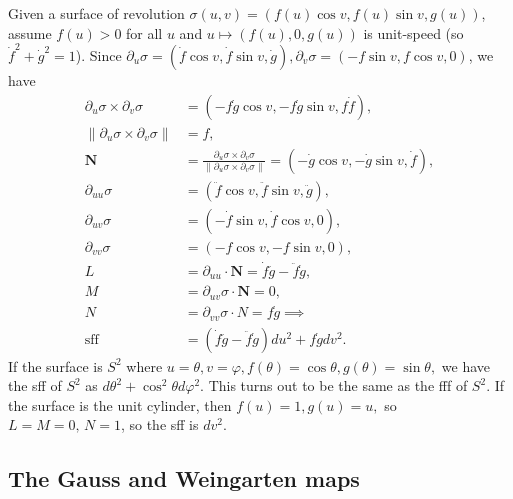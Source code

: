 \begin{example}
    Given a surface of revolution $\sigma(u,v)=(f(u)\cos v, f(u) \sin v, g(u))$, assume $f(u)>0$ for all $u$ and $u \mapsto (f(u),0,g(u))$ is unit-speed (so $\dot f^2+\dot g^2=1$). Since $\partial _u\sigma=(\dot f \cos v, \dot f \sin v, \dot g), \partial _v\sigma=(-f \sin v, f \cos v, 0)$, we have 
    \begin{align*}
        \partial _u\sigma \times \partial _v\sigma&=(-f\dot g \cos v, -f \dot g \sin v, f \dot f),\\
        \|\partial _u\sigma \times  \partial _v\sigma\|&= f,\\
        \mathbf N&=\frac{\partial _u\sigma \times \partial _v\sigma}{\|\partial _u\sigma \times \partial _v\sigma\|}=(-\dot g \cos v, -\dot g \sin v, \dot f),\\
        \partial _{uu}\sigma&=(\ddot f \cos v, \ddot f \sin v, \ddot g),\\
        \partial _{uv}\sigma &=(-\dot f \sin v, \dot f \cos v, 0),\\
        \partial _{vv}\sigma&=(-f \cos v, - f \sin v, 0),\\
        L&=\partial _{uu}\cdot \mathbf N=\dot f \ddot g- \ddot f \dot g,\\
        M&=\partial _{uv}\sigma \cdot \mathbf N=0,\\
        N&=\partial _{vv}\sigma \cdot N=f\dot g \implies \\
        \text{sff} \ &= (\dot f\ddot g -\ddot f \dot g)du ^2+f\dot gdv^2.
    \end{align*}
    If the surface is $S^2$ where $u=\theta,v=\varphi ,f(\theta)=\cos \theta, g(\theta)=\sin \theta,$ we have the sff of $S^2$ as $d\theta ^2+ \cos ^2 \theta d\varphi  ^2$. This turns out to be the same as the fff of $S^2$. If the surface is the unit cylinder, then $f(u)=1,g(u)=u,$ so $L=M=0, \, N=1$, so the sff is $dv^2$.
\end{example}

\subsection{The Gauss and Weingarten maps}

